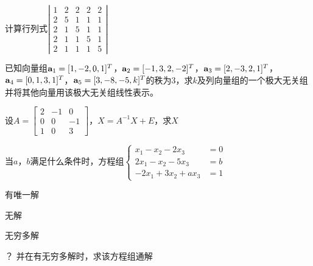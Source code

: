 \documentclass[a4paper]{exam}
\begin{document}
\begin{CJK*}{UTF8}{gbsn}
\begin{questions}
	    \vspace{2.5cm}
 
		\question 计算行列式$\left| {\begin{array}{*{20}{c}}
			1&2&2&2&2\\
			2&5&1&1&1\\
			2&1&5&1&1\\
			2&1&1&5&1\\
			2&1&1&1&5
			\end{array}} \right|$
		
		\vspace{2.5cm}
	
	\question 已知向量组${{\bf{a}}_1} = {[1, -2,0,1]^T}$，${{\bf{a}}_2} = {[-1, 3,2,-2]^T}$，${{\bf{a}}_3} = {[2, -3,2,1]^T}$，${{\bf{a}}_4} = {[0,1,3,1]^T}$，${{\bf{a}}_5} = {[3,-8,-5,k]^T}$的秩为3，求$k$及列向量组的一个极大无关组并将其他向量用该极大无关组线性表示。
	
	\vspace{3cm}
	
	\question 设$A = \left[ {\begin{array}{*{20}{c}}
		2&{ - 1}&0\\
		0&0&{ - 1}\\
		1&0&3
		\end{array}} \right]$，$X = {A^{ - 1}}X + E$，求$X$
	
	\vspace{2.5cm}
	
	\question 当$a$，$b$满足什么条件时，方程组$\begin{cases}
	x_1-x_2-2x_3 &=0\\
	2x_1-x_2-5x_3 &=b\\
	-2x_1+3x_2+ax_3 &=1
	\end{cases}$
	\begin{inparaenum}[ (1)]
		\item 有唯一解
		\item 无解
		\item 无穷多解
	\end{inparaenum}？
	并在有无穷多解时，求该方程组通解
	

\end{questions}
\end{CJK*}
\end{document}
